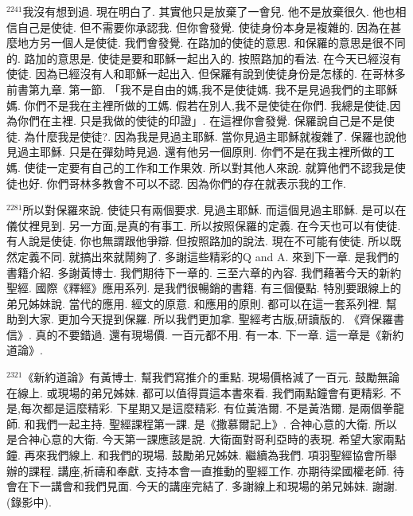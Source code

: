 \documentclass{book}
\begin{document}
$^{2241}$我沒有想到過.
現在明白了.
其實他只是放棄了一會兒.
他不是放棄很久.
他也相信自己是使徒.
但不需要你承認我.
但你會發覺.
使徒身份本身是複雜的.
因為在甚麼地方另一個人是使徒.
我們會發覺.
在路加的使徒的意思.
和保羅的意思是很不同的.
路加的意思是.
使徒是要和耶穌一起出入的.
按照路加的看法.
在今天已經沒有使徒.
因為已經沒有人和耶穌一起出入.
但保羅有說到使徒身份是怎樣的.
在哥林多前書第九章.
第一節.
「我不是自由的媽,我不是使徒媽.
我不是見過我們的主耶穌媽.
你們不是我在主裡所做的工媽.
假若在別人,我不是使徒在你們.
我總是使徒,因為你們在主裡.
只是我做的使徒的印證」.
在這裡你會發覺.
保羅說自己是不是使徒.
為什麼我是使徒?.
因為我是見過主耶穌.
當你見過主耶穌就複雜了.
保羅也說他見過主耶穌.
只是在彈劾時見過.
還有他另一個原則.
你們不是在我主裡所做的工媽.
使徒一定要有自己的工作和工作果效.
所以對其他人來說.
就算他們不認我是使徒也好.
你們哥林多教會不可以不認.
因為你們的存在就表示我的工作.

$^{2281}$所以對保羅來說.
使徒只有兩個要求.
見過主耶穌.
而這個見過主耶穌.
是可以在儀仗裡見到.
另一方面,是真的有事工.
所以按照保羅的定義.
在今天也可以有使徒.
有人說是使徒.
你也無謂跟他爭辯.
但按照路加的說法.
現在不可能有使徒.
所以既然定義不同.
就搞出來就鬧夠了.
多謝這些精彩的Q and A.
來到下一章.
是我們的書籍介紹.
多謝黃博士.
我們期待下一章的.
三至六章的內容.
我們藉著今天的新約聖經.
國際《釋經》應用系列.
是我們很暢銷的書籍.
有三個優點.
特別要跟線上的弟兄姊妹說.
當代的應用.
經文的原意.
和應用的原則.
都可以在這一套系列裡.
幫助到大家.
更加今天提到保羅.
所以我們更加拿.
聖經考古版,研讀版的.
《齊保羅書信》.
真的不要錯過.
還有現場價.
一百元都不用.
有一本.
下一章.
這一章是《新約道論》.

$^{2321}$《新約道論》有黃博士.
幫我們寫推介的重點.
現場價格減了一百元.
鼓勵無論在線上.
或現場的弟兄姊妹.
都可以值得買這本書來看.
我們兩點鐘會有更精彩.
不是,每次都是這麼精彩.
下星期又是這麼精彩.
有位黃浩爾.
不是黃浩爾.
是兩個拳龍師.
和我們一起主持.
聖經課程第一課.
是《撒慕爾記上》.
合神心意的大衛.
所以是合神心意的大衛.
今天第一課應該是說.
大衛面對哥利亞時的表現.
希望大家兩點鐘.
再來我們線上.
和我們的現場.
鼓勵弟兄姊妹.
繼續為我們.
項羽聖經協會所舉辦的課程.
講座,祈禱和奉獻.
支持本會一直推動的聖經工作.
亦期待梁國權老師.
待會在下一講會和我們見面.
今天的講座完結了.
多謝線上和現場的弟兄姊妹.
謝謝.
(錄影中).
\newpage
\end{document}
